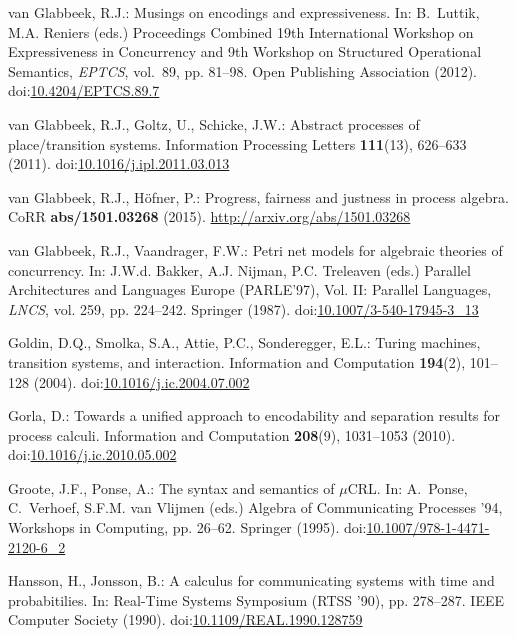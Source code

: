 \documentclass[smallcondensed]{svjour3}
\providecommand{\urlalt}[2]{\href{#1}{#2}}
\providecommand{\doi}[1]{doi:\urlalt{http://dx.doi.org/#1}{#1}}
\begin{document}
\begin{thebibliography}{10}
van Glabbeek, R.J.: Musings on encodings and expressiveness.
\newblock In: B.~Luttik, M.A. Reniers (eds.) {\rm Proceedings Combined 19th
  International Workshop on} Expressiveness in Concurrency {\rm and 9th
  Workshop on} Structured Operational Semantics, \emph{\rm EPTCS}, vol.~89, pp.
  81--98. Open Publishing Association (2012).
\newblock \doi{10.4204/EPTCS.89.7}

van Glabbeek, R.J., Goltz, U., Schicke, J.W.: Abstract processes of
  place/transition systems.
\newblock Information Processing Letters
  \textbf{\hspace{-1pt}111\hspace{-1pt}}(\hspace{-1pt}13\hspace{-1pt}),
  626--633 (\hspace{-1pt}2011\hspace{-1pt}).
\newblock \doi{10.1016/j.ipl.2011.03.013}

van Glabbeek, R.J., H{\"o}fner, P.: Progress, fairness and justness in process
  algebra.
\newblock CoRR \textbf{{\normalfont abs/1501.03268}} (2015).
\newblock \urlprefix\url{http://arxiv.org/abs/1501.03268}

van Glabbeek, R.J., Vaandrager, F.W.: Petri net models for algebraic theories
  of concurrency.
\newblock In: J.W.d. Bakker, A.J. Nijman, P.C. Treleaven (eds.) Parallel
  Architectures and Languages Europe (PARLE'97), Vol. II: Parallel Languages,
  \emph{\rm LNCS}, vol. 259, pp. 224--242. Springer (1987).
\newblock \doi{10.1007/3-540-17945-3\_13}

Goldin, D.Q., Smolka, S.A., Attie, P.C., Sonderegger, E.L.: Turing machines,
  transition systems, and interaction.
\newblock Information and Computation \textbf{194}(2), 101--128 (2004).
\newblock \doi{10.1016/j.ic.2004.07.002}

Gorla, D.: Towards a unified approach to encodability and separation results
  for process calculi.
\newblock Information and Computation \textbf{208}(9), 1031--1053 (2010).
\newblock \doi{10.1016/j.ic.2010.05.002}

Groote, J.F., Ponse, A.: The syntax and semantics of $\mu${CRL}.
\newblock In: A.~Ponse, C.~Verhoef, S.F.M. {van Vlijmen} (eds.) Algebra of
  Communicating Processes '94, Workshops in Computing, pp. 26--62. Springer
  (1995).
\newblock \doi{10.1007/978-1-4471-2120-6\_2}

Hansson, H., Jonsson, B.: A calculus for communicating systems with time and
  probabitilies.
\newblock In: Real-Time Systems Symposium (RTSS '90), pp. 278--287. IEEE
  Computer Society (1990).
\newblock \doi{10.1109/REAL.1990.128759}


\end{thebibliography}
\end{document}
